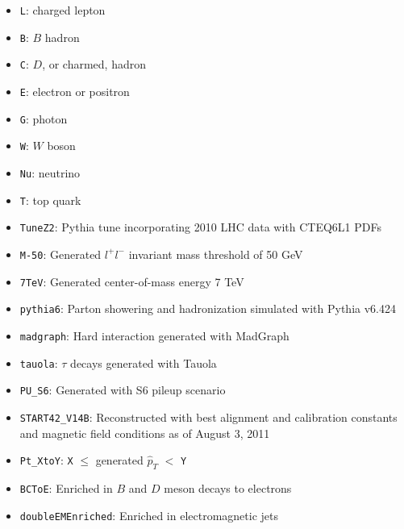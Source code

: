 \documentclass[dissertation.tex]{subfiles}
\begin{document}
\begin{itemize}
\item \verb+L+: charged lepton
\item \verb+B+: $B$ hadron
\item \verb+C+: $D$, or charmed, hadron
\item \verb+E+: electron or positron
\item \verb+G+: photon
\item \verb+W+: $W$ boson
\item \verb+Nu+: neutrino
\item \verb+T+: top quark
\item \verb+TuneZ2+: Pythia tune incorporating 2010 LHC data with CTEQ6L1 \cite{CTEQ6} PDFs \cite{LPCC_MBUE_WG}
\item \verb+M-50+: Generated $l^{+}l^{-}$ invariant mass threshold of 50 GeV
\item \verb+7TeV+: Generated center-of-mass energy 7 TeV
\item \verb+pythia6+: Parton showering and hadronization simulated with Pythia v6.424 \cite{Pythia6}
\item \verb+madgraph+: Hard interaction generated with MadGraph \cite{MadGraph}
\item \verb+tauola+: $\tau$ decays generated with Tauola \cite{Tauola}
\item \verb+PU_S6+: Generated with S6 pileup scenario %
\item \verb+START42_V14B+: Reconstructed with best alignment and calibration constants and magnetic field conditions as of August 3, 2011
\item \verb+Pt_XtoY+: \verb+X+ $\leq$ generated $\hat{p}_{T}$ $<$ \verb+Y+
\item \verb+BCToE+: Enriched in $B$ and $D$ meson decays to electrons
\item \verb+doubleEMEnriched+: Enriched in electromagnetic jets %
\end{itemize}
\end{document}
